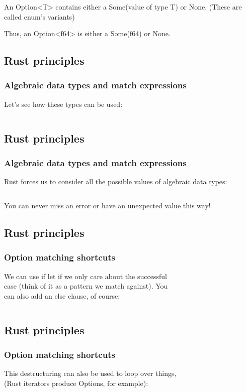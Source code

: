 \documentclass[usenames,twocolumn,dvipsnames,10pt,a4wide]{article}
\begin{document}
An Option<T>
contains either a Some(value of type T)
or None.
(These are called enum's variants)

Thus, an Option<f64>
is either a Some(f64)
or None.

\subsection{Rust principles}
\subsubsection{Algebraic data types and match expressions}
Let's see how these types can be used:

\inputminted[fontsize=\normalsize]{rust}{code/option2.rs}


\subsection{Rust principles}
\subsubsection{Algebraic data types and match expressions}
Rust forces us to consider all the possible values
of algebraic data types:

\inputminted[fontsize=\normalsize]{rust}{code/option3.rs}

You can never miss an error or have an unexpected value this way!

\subsection{Rust principles}
\subsubsection{Option matching shortcuts}
We can use if let if we only care about the successful\\
case (think of it as a pattern we match against). You\\
can also add an else clause, of course:

\inputminted[fontsize=\normalsize]{rust}{code/option4.rs}

\subsection{Rust principles}
\subsubsection{Option matching shortcuts}
This destructuring can also be used to loop over things,\\
(Rust iterators produce Options, for example):\\
\end{document}
